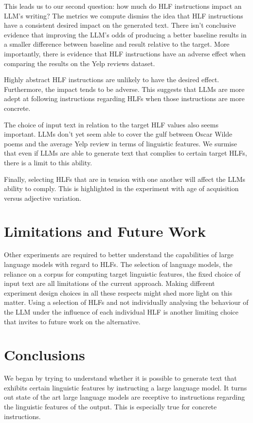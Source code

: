 \documentclass[11pt]{article}
\begin{document}
This leads us to our second question: how much do HLF instructions impact an
LLM's writing?
The metrics we compute dismiss the idea that HLF instructions have a consistent
desired impact on the generated text.
There isn't conclusive evidence that improving the LLM's odds of producing a
better baseline results in a smaller difference between baseline and result
relative to the target.
More importantly, there is evidence that HLF instructions have an adverse effect
when comparing the results on the Yelp reviews dataset.

Highly abstract HLF instructions are unlikely to have the desired effect.
Furthermore, the impact tends to be adverse.
This suggests that LLMs are more adept at following instructions regarding HLFs
when those instructions are more concrete.

The choice of input text in relation to the target HLF values also seems
important.
LLMs don't yet seem able to cover the gulf between Oscar Wilde poems and the
average Yelp review in terms of linguistic features.
We surmise that even if LLMs are able to generate text that complies to certain
target HLFs, there is a limit to this ability.

Finally, selecting HLFs that are in tension with one another will affect the
LLMs ability to comply.
This is highlighted in the experiment with age of acquisition versus adjective
variation.

\section{Limitations and Future Work}

Other experiments are required to better understand the capabilities of large
language models with regard to HLFs.
The selection of language models, the reliance on a corpus for computing target
linguistic features, the fixed choice of input text are all limitations of the
current approach.
Making different experiment design choices in all these respects might shed more
light on this matter.
Using a selection of HLFs and not individually analysing the behaviour of the
LLM under the influence of each individual HLF is another limiting choice that
invites to future work on the alternative.

\section{Conclusions}

We began by trying to understand whether it is possible to generate text that
exhibits certain linguistic features by instructing a large language model.
It turns out state of the art large language models are receptive to
instructions regarding the linguistic features of the output.
This is especially true for concrete instructions.
\end{document}
